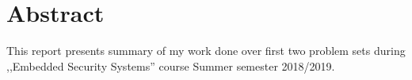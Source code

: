 \documentclass[12pt]{article}
\begin{document}


\section{Abstract}

This report presents summary of my work done over first two problem sets
during ,,Embedded Security Systems'' course Summer semester 2018/2019.



\end{document}
